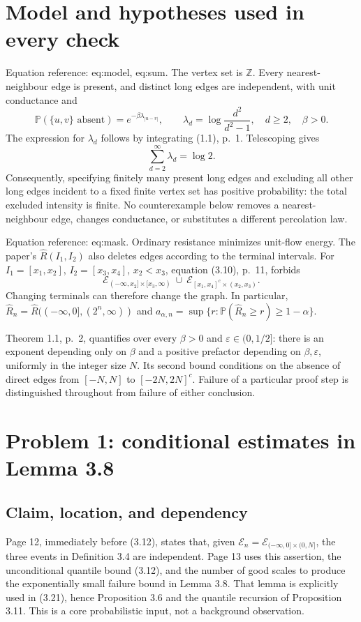 \documentclass[10pt]{article}
\begin{document}
\section*{Model and hypotheses used in every check}
Equation reference: eq:model, eq:sum. The vertex set is \(\mathbb Z\). Every nearest-neighbour edge is present, and distinct long edges are independent, with unit conductance and \[
 \mathbb P(\{u,v\}\text{ absent})=e^{-\beta\lambda_{|u-v|}},\qquad
 \lambda_d=\log\frac{d^2}{d^2-1},\quad d\ge2,\quad \beta>0.\] The expression for \(\lambda_d\) follows by integrating (1.1), p. 1. Telescoping gives \[
 \sum_{d=2}^{\infty}\lambda_d=\log2.\] Consequently, specifying finitely many present long edges and excluding all other long edges incident to a fixed finite vertex set has positive probability: the total excluded intensity is finite. No counterexample below removes a nearest-neighbour edge, changes conductance, or substitutes a different percolation law.\par
Equation reference: eq:mask. Ordinary resistance minimizes unit-flow energy. The paper’s \(\widehat R(I_1,I_2)\) also deletes edges according to the terminal intervals. For \(I_1=[x_1,x_2]\), \(I_2=[x_3,x_4]\), \(x_2<x_3\), equation (3.10), p. 11, forbids \[
 \mathcal E_{(-\infty,x_2]\times[x_3,\infty)}
 \ \cup\ \mathcal E_{[x_1,x_4]^c\times(x_2,x_3)}.\] Changing terminals can therefore change the graph. In particular, \(\widehat R_n=\widehat R((-\infty,0],(2^n,\infty))\) and \(a_{\alpha,n}=\sup\{r:\mathbb P(\widehat R_n\ge r)\ge1-\alpha\}\).\par
Theorem 1.1, p. 2, quantifies over every \(\beta>0\) and \(\varepsilon\in(0,1/2]\): there is an exponent depending only on \(\beta\) and a positive prefactor depending on \(\beta,\varepsilon\), uniformly in the integer size \(N\). Its second bound conditions on the absence of direct edges from \([-N,N]\) to \([-2N,2N]^c\). Failure of a particular proof step is distinguished throughout from failure of either conclusion.\par
\section*{Problem 1: conditional estimates in Lemma 3.8}
\subsection*{Claim, location, and dependency}
Page 12, immediately before (3.12), states that, given \(\mathcal E_n=\mathcal E_{(-\infty,0]\times(0,N]}\), the three events in Definition 3.4 are independent. Page 13 uses this assertion, the unconditional quantile bound (3.12), and the number of good scales to produce the exponentially small failure bound in Lemma 3.8. That lemma is explicitly used in (3.21), hence Proposition 3.6 and the quantile recursion of Proposition 3.11. This is a core probabilistic input, not a background observation.\par
\end{document}
